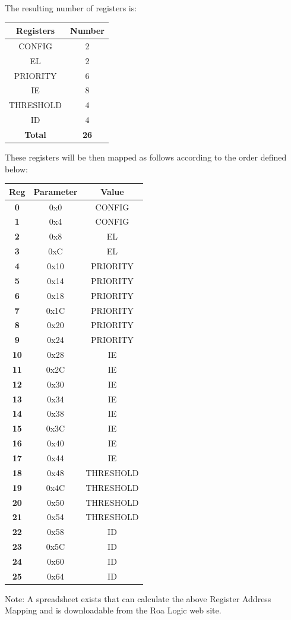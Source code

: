 The resulting number of registers is:

\begin{longtable}[]{@{}cc@{}}
\toprule
\textbf{Registers} & \textbf{Number}\tabularnewline
\midrule
\endhead
CONFIG & 2\tabularnewline
EL & 2\tabularnewline
PRIORITY & 6\tabularnewline
IE & 8\tabularnewline
THRESHOLD & 4\tabularnewline
ID & 4\tabularnewline
\textbf{Total} & \textbf{26}\tabularnewline
\bottomrule
\end{longtable}

These registers will be then mapped as follows according to the order
defined below:

\begin{longtable}[]{@{}ccc@{}}
\toprule
\textbf{Reg} & \textbf{Parameter} & \textbf{Value}\tabularnewline
\midrule
\endhead
\textbf{0} & 0x0 & CONFIG\tabularnewline
\textbf{1} & 0x4 & CONFIG\tabularnewline
\textbf{2} & 0x8 & EL\tabularnewline
\textbf{3} & 0xC & EL\tabularnewline
\textbf{4} & 0x10 & PRIORITY\tabularnewline
\textbf{5} & 0x14 & PRIORITY\tabularnewline
\textbf{6} & 0x18 & PRIORITY\tabularnewline
\textbf{7} & 0x1C & PRIORITY\tabularnewline
\textbf{8} & 0x20 & PRIORITY\tabularnewline
\textbf{9} & 0x24 & PRIORITY\tabularnewline
\textbf{10} & 0x28 & IE\tabularnewline
\textbf{11} & 0x2C & IE\tabularnewline
\textbf{12} & 0x30 & IE\tabularnewline
\textbf{13} & 0x34 & IE\tabularnewline
\textbf{14} & 0x38 & IE\tabularnewline
\textbf{15} & 0x3C & IE\tabularnewline
\textbf{16} & 0x40 & IE\tabularnewline
\textbf{17} & 0x44 & IE\tabularnewline
\textbf{18} & 0x48 & THRESHOLD\tabularnewline
\textbf{19} & 0x4C & THRESHOLD\tabularnewline
\textbf{20} & 0x50 & THRESHOLD\tabularnewline
\textbf{21} & 0x54 & THRESHOLD\tabularnewline
\textbf{22} & 0x58 & ID\tabularnewline
\textbf{23} & 0x5C & ID\tabularnewline
\textbf{24} & 0x60 & ID\tabularnewline
\textbf{25} & 0x64 & ID\tabularnewline
\bottomrule
\end{longtable}

Note: A spreadsheet exists that can calculate the above Register Address
Mapping and is downloadable from the Roa Logic web site.

